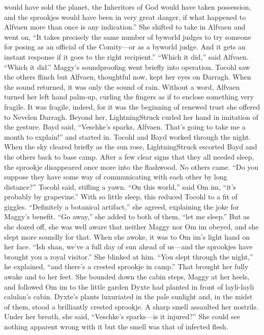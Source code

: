 \documentclass[9pt]{article}
\begin{document}
would have sold the planet, the Inheritors of God would have taken possession, and the sprookjes would
have been in very great danger, if what happened to Alfvaen more than once is any indication.”
She shifted to take in Alfvaen and went on, “It takes precisely the same number of byworld judges to
try someone for posing as an official of the Comity—or as a byworld judge. And it gets an instant
response if it goes to the right recipient.”
“Which it did,” said Alfvaen.
“Which it did.”
Maggy’s soundproofing went briefly into operation. Tocohl saw the others flinch but Alfvaen,
thoughtful now, kept her eyes on Darragh. When the sound returned, it was only the sound of rain.
Without a word, Alfvaen turned her left hand palm-up, curling the fingers as if to enclose something very
fragile. It was fragile, indeed, for it was the beginning of renewed trust she offered to Nevelen Darragh.
Beyond her, LightningStruck curled her hand in imitation of the gesture. Bayd said, “Veschke’s
sparks, Alfvaen. That’s going to take me a month to explain!” and started in.
Tocohl and Bayd worked through the night. When the sky cleared briefly as the sun rose,
LightningStruck escorted Bayd and the others back to base camp. After a few clear signs that they all
needed sleep, the sprookje disappeared once more into the flashwood. No others came.
“Do you suppose they have some way of communicating with each other by long distance?” Tocohl
said, stifling a yawn. 
“On this world,” said Om im, “it’s probably by grapevine.”
With so little sleep, this reduced Tocohl to a fit of giggles. “Definitely a botanical artifact,” she agreed,
explaining the joke for Maggy’s benefit. “Go away,” she added to both of them, “let me sleep.” But as
she dozed off, she was well aware that neither Maggy nor Om im obeyed, and she slept more soundly
for that.
When she awoke, it was to Om im’s light hand on her face. “Ish shan, we’ve a full day of sun ahead
of us—and the sprookjes have brought you a royal visitor.” She blinked at him. “You slept through the
night,” he explained, “and there’s a crested sprookje in camp.”
That brought her fully awake and to her feet. She bounded down the cabin steps, Maggy at her
heels, and followed Om im to the little garden Dyxte had planted in front of layli-layli calulan’s cabin.
Dyxte’s plants luxuriated in the pale sunlight and, in the midst of them, stood a brilliantly crested
sprookje.
A sharp smell assaulted her nostrils. Under her breath, she said, “Veschke’s sparks—is it injured?”
She could see nothing apparent wrong with it but the smell was that of infected flesh.
\end{document}
